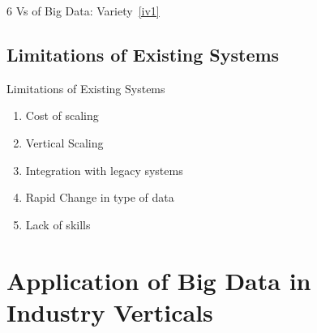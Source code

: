 \documentclass[pdf]{beamer}
\begin{document}
\begin{frame}[fragile, label={vari}]{6 Vs of Big Data: Variety~\ref{iv1}}
\end{frame}

\subsection{Limitations of Existing Systems}
\begin{frame}[fragile]{Limitations of Existing Systems}
\begin{enumerate}
	\item Cost of scaling \pause
	\item Vertical Scaling \pause
	\item Integration with legacy systems \pause
	\item Rapid Change in type of data \pause
	\item Lack of skills
\end{enumerate}
\end{frame}

\section{Application of Big Data in Industry Verticals}
\end{document}

